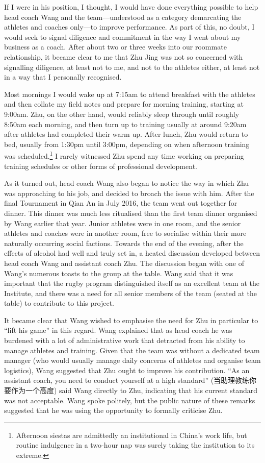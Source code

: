 \begin{CJK}{UTF8}{gbsn}
If I were in his position, I thought, I would have done everything possible to help head coach Wang and the team—understood as  a category demarcating the athletes and coaches only---to improve performance.  As part of this, no doubt, I would seek to signal diligence and commitment in the way I went about my business as a coach.  After about two or three weeks into our roommate relationship, it became clear to me that Zhu Jing was not so concerned with signalling diligence, at least not to me, and not to the athletes either, at least not in a way that I personally recognised.

Most mornings I would wake up at 7:15am to attend breakfast with the athletes and then collate my field notes and prepare for morning training, starting at 9:00am.  Zhu, on the other hand, would reliably sleep through until roughly 8:50am each morning, and then turn up to training usually at around 9:20am after athletes had completed their warm up.  After lunch, Zhu would return to bed, usually from 1:30pm until 3:00pm, depending on when afternoon training was scheduled.\footnote{Afternoon siestas are admittedly an institutional in China's work life, but routine indulgence in a two-hour nap was surely taking the institution to its extreme.}  I rarely witnessed Zhu spend any time working on preparing training schedules or other forms of professional development.

As it turned out, head coach Wang also began to notice the way in which Zhu was approaching to his job, and decided to broach the issue with him.  After the final Tournament in Qian An in July 2016, the team went out together for dinner.  This dinner was much less ritualised than the first team dinner organised by Wang earlier that year.  Junior athletes were in one room, and the senior athletes and coaches were in another room, free to socialise within their more naturally occurring social factions.  Towards the end of the evening, after the effects of alcohol had well and truly set in, a heated discussion developed between head coach Wang and assistant coach Zhu. The discussion began with one of Wang's numerous toasts to the group at the table.  Wang said that it was important that the rugby program distinguished itself as an excellent team at the Institute, and there was a need for all senior members of the team (seated at the table) to contribute to this project.

It became clear that Wang wished to emphasise the need for Zhu in particular to ``lift his game'' in this regard. Wang explained that as head coach he was burdened with a lot of administrative work that detracted from his ability to manage athletes and training.  Given that the team was without a dedicated team manager (who would usually manage daily concerns of athletes and organise team logistics), Wang suggested that Zhu ought to improve his contribution. ``As an assistant coach, you need to conduct yourself at a high standard'' (当助理教练你要作为一个高度) said Wang directly to Zhu, indicating that his current standard was not acceptable. Wang spoke politely, but the public nature of these remarks suggested that he was using the opportunity to formally criticise Zhu.


\end{CJK}
